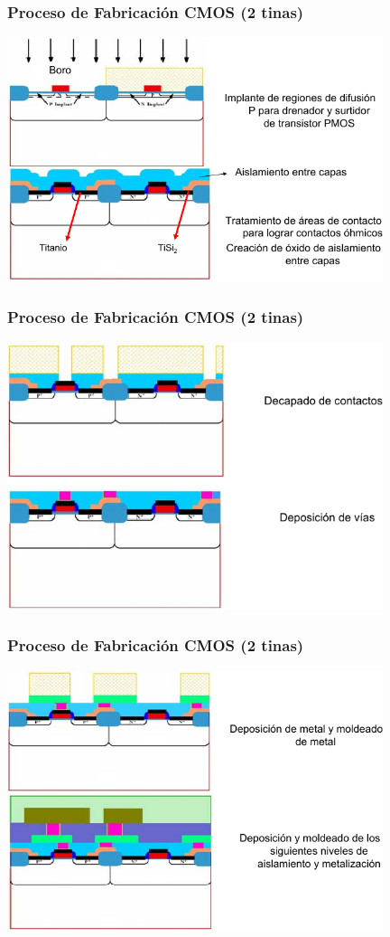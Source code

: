 \documentclass[aspectratio=169,10pt]{beamer}
\begin{document}
\begin{frame}
\frametitle{Proceso de Fabricación CMOS (2 tinas)}
\centering
\includegraphics[width=11cm]{CMOS7}
\end{frame}


\begin{frame}
\frametitle{Proceso de Fabricación CMOS (2 tinas)}
\centering
\includegraphics[width=11cm]{CMOS8}
\end{frame}


\begin{frame}
\frametitle{Proceso de Fabricación CMOS (2 tinas)}
\centering
\includegraphics[width=11cm]{CMOS9}
\end{frame}
\end{document}
